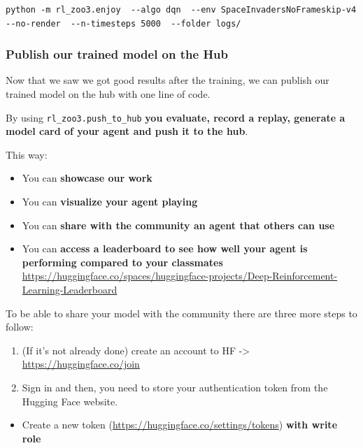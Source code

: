 \documentclass[11pt,a4paper]{article}
\begin{document}
\begin{lstlisting}
python -m rl_zoo3.enjoy  --algo dqn  --env SpaceInvadersNoFrameskip-v4  --no-render  --n-timesteps 5000  --folder logs/
\end{lstlisting}

\subsubsection{Publish our trained model on the Hub}\label{publish-our-trained-model-on-the-hub}

Now that we saw we got good results after the training, we can publish our trained model on the hub with one line of code.


By using \texttt{rl\_zoo3.push\_to\_hub} \textbf{you evaluate, record a replay, generate a model card of your agent and push it to the hub}.

This way:

\begin{itemize}
\tightlist
\item
  You can \textbf{showcase our work}
\item
  You can \textbf{visualize your agent playing}
\item
  You can \textbf{share with the community an agent that others can use}
\item
  You can \textbf{access a leaderboard to see how well your agent is performing compared to your classmates} \url{https://huggingface.co/spaces/huggingface-projects/Deep-Reinforcement-Learning-Leaderboard}
\end{itemize}

To be able to share your model with the community there are three more steps to follow:

\begin{enumerate}
\def\labelenumi{\arabic{enumi}.}
\item
  (If it's not already done) create an account to HF -\textgreater{} \url{https://huggingface.co/join}
\item
  Sign in and then, you need to store your authentication token from the Hugging Face website.
\end{enumerate}

\begin{itemize}
\tightlist
\item
  Create a new token (\url{https://huggingface.co/settings/tokens}) \textbf{with write role}
\end{itemize}
\end{document}
